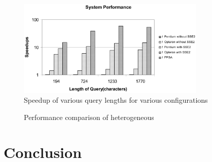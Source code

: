 \documentclass[12pt,twoside]{article}
\begin{document}
\begin{figure}%
    \centering
    \includegraphics[width=0.8\textwidth]{fig/perform1}
    \caption{Speedup of various query lengths for various configurations \cite[Figure 10]{meng_high-performance_2010}}
    \label{fig:perform1}
\end{figure}

\begin{figure}%
    \centering
    \caption{Performance comparison of heterogeneous \cite[Figure 12 (e,f)]{meng_high-performance_2010}}
    \label{fig:perform2}
\end{figure}

\section{Conclusion}
\label{sec:concl}
\end{document}
